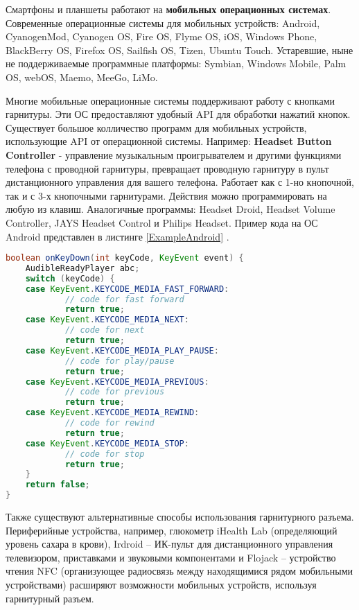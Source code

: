 Смартфоны и планшеты работают на \textbf{мобильных операционных системах}. Современные операционные системы для мобильных устройств: Android, CyanogenMod, Cyanogen OS, Fire OS, Flyme OS, iOS, Windows Phone, BlackBerry OS, Firefox OS, Sailfish OS, Tizen, Ubuntu Touch. Устаревшие, ныне не поддерживаемые программные платформы: Symbian, Windows Mobile, Palm OS, webOS, Maemo, MeeGo, LiMo. \cite{wiki-mob_os}

Многие мобильные операционные системы поддерживают работу с кнопками гарнитуры. Эти ОС предоставляют удобный API для обработки нажатий кнопок. Существует большое колличество программ для мобильных устройств, использующие API от операционной системы. Например: \textbf{Headset Button Controller} - управление музыкальным проигрывателем и другими функциями телефона с проводной гарнитуры, превращает проводную гарнитуру в пульт дистанционного управления для вашего телефона. Работает как с 1-но кнопочной, так и с 3-х кнопочными гарнитурами. Действия можно программировать на любую из клавиш. Аналогичные программы: Headset Droid, Headset Volume Controller, JAYS Headset Control и Philips Headset. Пример кода на ОС Android представлен в листинге \ref{ExampleAndroid} \cite{stackoverflow-android_push}.

\begin{lstlisting}[language=Java, caption={Пример обработки кнопки гарнитуры},label=ExampleAndroid]
boolean onKeyDown(int keyCode, KeyEvent event) { 
    AudibleReadyPlayer abc; 
    switch (keyCode) { 
    case KeyEvent.KEYCODE_MEDIA_FAST_FORWARD: 
            // code for fast forward 
            return true; 
    case KeyEvent.KEYCODE_MEDIA_NEXT: 
            // code for next 
            return true; 
    case KeyEvent.KEYCODE_MEDIA_PLAY_PAUSE: 
            // code for play/pause 
            return true; 
    case KeyEvent.KEYCODE_MEDIA_PREVIOUS: 
            // code for previous 
            return true; 
    case KeyEvent.KEYCODE_MEDIA_REWIND: 
            // code for rewind 
            return true; 
    case KeyEvent.KEYCODE_MEDIA_STOP: 
            // code for stop 
            return true; 
    } 
    return false; 
} 
\end{lstlisting}

Также существуют альтернативные способы использования гарнитурного разъема. Периферийные устройства, например, глюкометр iHealth Lab (определяющий уровень сахара в крови), Irdroid – ИК-пульт для дистанционного управления телевизором, приставками и звуковыми компонентами и Flojack – устройство чтения NFC (организующее радиосвязь между находящимися рядом мобильными устройствами) расширяют возможности мобильных устройств, используя гарнитурный разъем.

